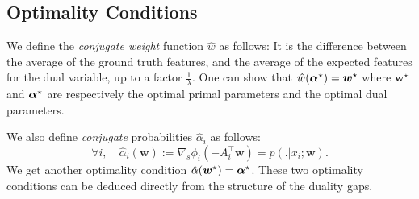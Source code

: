 \subsection{Optimality Conditions}
We define the \emph{conjugate weight} function $\hat{w}$ as follows:
It is the difference between the average of the ground truth features, and the average of the expected features for the dual variable, up to a factor $\frac{1}{\lambda}$.
One can show that $\hat{w}(\boldsymbol{\alpha}^{\star}) = \bm w^{\star}$ where $\bm w^{\star}$ and $\boldsymbol{\alpha}^{\star}$ are respectively the optimal primal parameters and the optimal dual parameters.

We  also  define  \emph{conjugate} probabilities $\hat{\alpha}_i$ as follows:
\begin{equation}
	\forall i, \quad \hat{\alpha}_i(\bm w) := \nabla_s\phi_i(-A_i^{\top} \bm w) = p(.|x_i; \bm w).
	\label{primal to dual}
\end{equation}
We get another optimality condition $\hat{\alpha}(\bm w^{\star}) = \boldsymbol{\alpha}^{\star}$.
These two optimality conditions can be deduced directly from the structure of the duality gaps.

